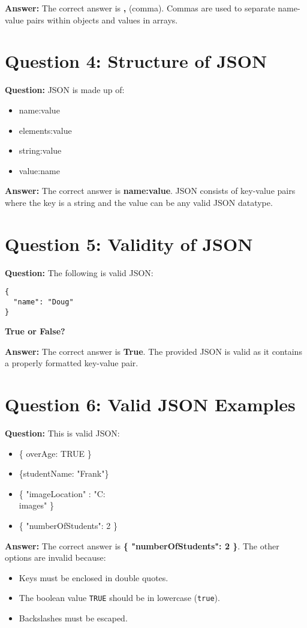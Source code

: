 \documentclass{article}
\begin{document}
\textbf{Answer:} The correct answer is \textbf{,} (comma). Commas are used to separate name-value pairs within objects and values in arrays.

\section*{Question 4: Structure of JSON}

\textbf{Question:} JSON is made up of:
\begin{itemize}
  \item name:value
  \item elements:value
  \item string:value
  \item value:name
\end{itemize}

\textbf{Answer:} The correct answer is \textbf{name:value}. JSON consists of key-value pairs where the key is a string and the value can be any valid JSON datatype.

\section*{Question 5: Validity of JSON}

\textbf{Question:} The following is valid JSON:

\begin{lstlisting}
{
  "name": "Doug"
}
\end{lstlisting}

\textbf{True or False?}

\textbf{Answer:} The correct answer is \textbf{True}. The provided JSON is valid as it contains a properly formatted key-value pair.

\section*{Question 6: Valid JSON Examples}

\textbf{Question:} This is valid JSON:
\begin{itemize}
  \item \{ overAge: TRUE \}
  \item \{studentName: "Frank"\}
  \item \{ "imageLocation" : "C:\\images" \}
  \item \{ "numberOfStudents": 2 \}
\end{itemize}

\textbf{Answer:} The correct answer is \textbf{\{ "numberOfStudents": 2 \}}. The other options are invalid because:
\begin{itemize}
  \item Keys must be enclosed in double quotes.
  \item The boolean value \texttt{TRUE} should be in lowercase (\texttt{true}).
  \item Backslashes must be escaped.
\end{itemize}
\end{document}
